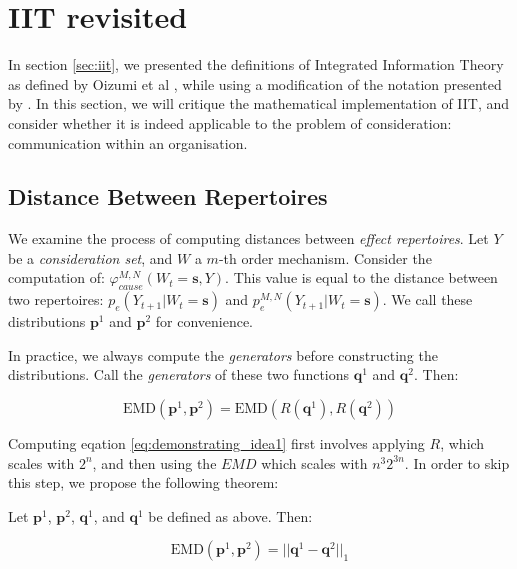 \section{IIT revisited}
In section \ref{sec:iit}, we presented the definitions of Integrated Information Theory as defined by Oizumi et al \cite{oizumi2014phenomenology}, while using a modification of the notation presented by \cite{krohn2016computing}. In this section, we will critique the mathematical implementation of IIT, and consider whether it is indeed applicable to the problem of consideration: communication within an organisation.

\subsection{Distance Between Repertoires}
\label{sec:speedup}
We examine the process of computing distances between \textit{effect repertoires}. Let $Y$ be a \textit{consideration set}, and $W$ a $m$-th order mechanism. Consider the computation of: $\varphi^{M,N}_{cause}(W_t = \mathbf{s}, Y)$. This value is equal to the distance between two repertoires: $p_e(Y_{t+1}|W_t = \mathbf{s})$ and $p_e^{M,N}(Y_{t+1}|W_t = \mathbf{s})$. We call these distributions $\mathbf{p}^1$ and $\mathbf{p}^2$ for convenience.

In practice, we always compute the \textit{generators} before constructing the distributions. Call the \textit{generators} of these two functions $\mathbf{q}^1$ and $\mathbf{q}^2$. Then:

\begin{equation}
\label{eq:demonstrating_idea1}
\text{EMD}(\mathbf{p}^1, \mathbf{p}^2) =\text{EMD}(R(\mathbf{q}^1), R(\mathbf{q}^2))
\end{equation}

Computing eqation \ref{eq:demonstrating_idea1} first involves applying $R$, which scales with $2^n$, and then using the $EMD$ which scales with $n^3 2^{3n}$. In order to skip this step, we propose the following theorem:

\begin{theorem}
	\label{thm:speedup}
	Let $\mathbf{p}^1$, $\mathbf{p}^2$, $\mathbf{q}^1$, and $\mathbf{q}^1$ be defined as above. Then:
	
	\begin{equation}
	\label{eq:theorem_statement}
	\text{EMD}(\mathbf{p}^1, \mathbf{p}^2)= ||\mathbf{q}^1 - \mathbf{q}^2||_1
	\end{equation}
\end{theorem}

